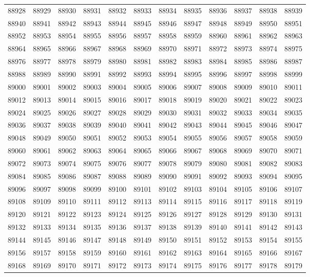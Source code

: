 \begin{center}
\begin{longtable}{llllllllllll}
88928 &88929 &88930 &88931 &88932 &88933 &88934 &88935 &88936 &88937 &88938 &88939 \\
88940 &88941 &88942 &88943 &88944 &88945 &88946 &88947 &88948 &88949 &88950 &88951 \\
88952 &88953 &88954 &88955 &88956 &88957 &88958 &88959 &88960 &88961 &88962 &88963 \\
88964 &88965 &88966 &88967 &88968 &88969 &88970 &88971 &88972 &88973 &88974 &88975 \\
88976 &88977 &88978 &88979 &88980 &88981 &88982 &88983 &88984 &88985 &88986 &88987 \\
88988 &88989 &88990 &88991 &88992 &88993 &88994 &88995 &88996 &88997 &88998 &88999 \\
89000 &89001 &89002 &89003 &89004 &89005 &89006 &89007 &89008 &89009 &89010 &89011 \\
89012 &89013 &89014 &89015 &89016 &89017 &89018 &89019 &89020 &89021 &89022 &89023 \\
89024 &89025 &89026 &89027 &89028 &89029 &89030 &89031 &89032 &89033 &89034 &89035 \\
89036 &89037 &89038 &89039 &89040 &89041 &89042 &89043 &89044 &89045 &89046 &89047 \\
89048 &89049 &89050 &89051 &89052 &89053 &89054 &89055 &89056 &89057 &89058 &89059 \\
89060 &89061 &89062 &89063 &89064 &89065 &89066 &89067 &89068 &89069 &89070 &89071 \\
89072 &89073 &89074 &89075 &89076 &89077 &89078 &89079 &89080 &89081 &89082 &89083 \\
89084 &89085 &89086 &89087 &89088 &89089 &89090 &89091 &89092 &89093 &89094 &89095 \\
89096 &89097 &89098 &89099 &89100 &89101 &89102 &89103 &89104 &89105 &89106 &89107 \\
89108 &89109 &89110 &89111 &89112 &89113 &89114 &89115 &89116 &89117 &89118 &89119 \\
89120 &89121 &89122 &89123 &89124 &89125 &89126 &89127 &89128 &89129 &89130 &89131 \\
89132 &89133 &89134 &89135 &89136 &89137 &89138 &89139 &89140 &89141 &89142 &89143 \\
89144 &89145 &89146 &89147 &89148 &89149 &89150 &89151 &89152 &89153 &89154 &89155 \\
89156 &89157 &89158 &89159 &89160 &89161 &89162 &89163 &89164 &89165 &89166 &89167 \\
89168 &89169 &89170 &89171 &89172 &89173 &89174 &89175 &89176 &89177 &89178 &89179 \\

\end{longtable}
\end{center}
